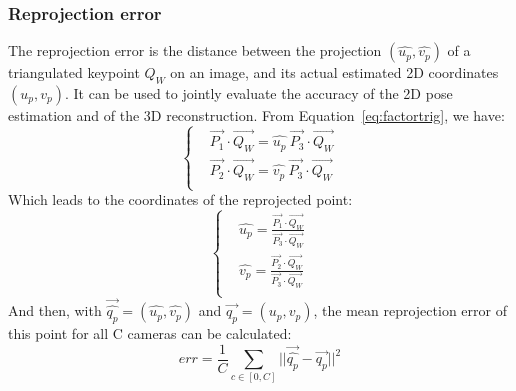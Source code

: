 

\subsubsection{Reprojection error}  

The reprojection error is the distance between the projection $(\widehat{u_p}, \widehat{v_p})$ of a triangulated keypoint $Q_W$ on an image, and its actual estimated 2D coordinates $(u_p, v_p)$. It can be used to jointly evaluate the accuracy of the 2D pose estimation and of the 3D reconstruction. From Equation~\ref{eq:factortrig}, we have:
\begin{equation}
    \begin{cases}
      &  \overrightarrow{P_1}\cdot \overrightarrow{Q_W} = \widehat{u_p} \ \overrightarrow{P_3} \cdot \overrightarrow{Q_W}\\
      &  \overrightarrow{P_2} \cdot \overrightarrow{Q_W} = \widehat{v_p} \ \overrightarrow{P_3} \cdot \overrightarrow{Q_W}\\
    \end{cases}
\end{equation}
Which leads to the coordinates of the reprojected point:
\begin{equation}
    \begin{cases}
      & \widehat{u_p} = \frac{\overrightarrow{P_1}\cdot \overrightarrow{Q_W}}{\overrightarrow{P_3} \cdot \overrightarrow{Q_W}}\\
      & \widehat{v_p} = \frac{\overrightarrow{P_2}\cdot \overrightarrow{Q_W}}{\overrightarrow{P_3} \cdot \overrightarrow{Q_W}}\\
    \end{cases}
\end{equation}
And then, with $\overrightarrow{\widehat{q_p}} = (\widehat{u_p}, \widehat{v_p})$ and $\overrightarrow{q_p} = (u_p, v_p)$, the mean reprojection error of this point for all C cameras can be calculated:
\begin{equation}
  \boxed{
  err = \frac{1}{C} \sum_{c \in [0,C]} ||\overrightarrow{\widehat{q_p}}-\overrightarrow{q_p}||^2 
  }
\end{equation}

